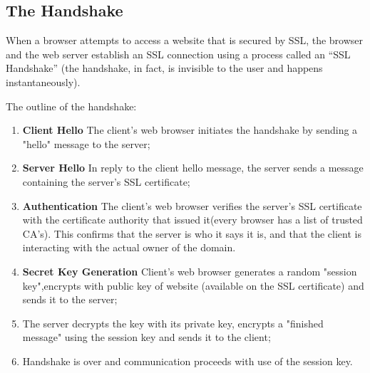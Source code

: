 \subsection{The Handshake} \cite{digicert} \cite{cloudflare_handshake}

When a browser attempts to access a website that is secured by SSL, the browser and the web server establish an SSL connection using a process called an “SSL Handshake” (the handshake, in fact, is invisible to the user and happens instantaneously).

The outline of the handshake:
\begin{enumerate}
\item \textbf{Client Hello} The client's web browser initiates the handshake by sending a "hello" message to the server;
\item \textbf{Server Hello} In reply to the client hello message, the server sends a message containing the server's SSL certificate;
\item \textbf{Authentication} The client's web browser verifies the server's SSL certificate with the certificate authority that issued it(every browser has a list of trusted CA's). This confirms that the server is who it says it is, and that the client is interacting with the actual owner of the domain.
\item \textbf{Secret Key Generation} Client's web browser generates a random "session key",encrypts with public key of website (available on the SSL certificate) and sends it to the server;
\item The server decrypts the key with its private key, encrypts a "finished message" using the session key and sends it to the client;
\item Handshake is over and communication proceeds with use of the session key.
\end{enumerate}

